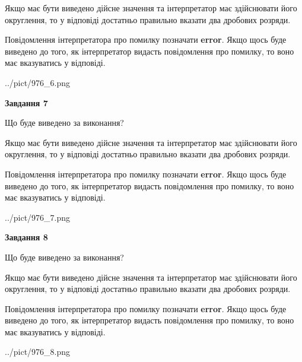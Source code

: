 \documentclass[12pt, ukrainian]{article}
\begin{document}
{\begin {Large}
Якщо має бути виведено дійсне значення та інтерпретатор має здійснювати його округлення, 
то у відповіді достатньо правильно вказати два дробових розряди.

Повідомлення інтерпретатора про помилку позначати \textbf{error}.
Якщо щось буде виведено до того, як інтерпретатор видасть повідомлення про помилку, 
то воно має вказуватись у відповіді. \par

\begin{center}
	{../pict/976_6.png}
\end{center}
\newpage

{\begin {center}\textbf{Завдання 7}\end {center}}\par
Що буде виведено за виконання? \par

Якщо має бути виведено дійсне значення та інтерпретатор має здійснювати його округлення, 
то у відповіді достатньо правильно вказати два дробових розряди.

Повідомлення інтерпретатора про помилку позначати \textbf{error}.
Якщо щось буде виведено до того, як інтерпретатор видасть повідомлення про помилку, 
то воно має вказуватись у відповіді. \par

\begin{center}
	{../pict/976_7.png}
\end{center}
\newpage

{\begin {center}\textbf{Завдання 8}\end {center}}\par
Що буде виведено за виконання? \par

Якщо має бути виведено дійсне значення та інтерпретатор має здійснювати його округлення, 
то у відповіді достатньо правильно вказати два дробових розряди.

Повідомлення інтерпретатора про помилку позначати \textbf{error}.
Якщо щось буде виведено до того, як інтерпретатор видасть повідомлення про помилку, 
то воно має вказуватись у відповіді. \par

\begin{center}
	{../pict/976_8.png}
\end{center}
\newpage


\end{Large}}
\end{document}
